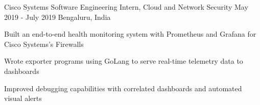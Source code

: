 \resumeExp
{Cisco Systems}
{Software Engineering Intern, Cloud and Network Security}
{May 2019 - July 2019}
{Bengaluru, India}

\resumeItemListStart
\item[$\bullet$]{Built an end-to-end health monitoring system with Prometheus and Grafana for Cisco Systems's Firewalls}
	\item[$\bullet$]{Wrote exporter programs using GoLang to serve real-time telemetry data to dashboards}
	\item[$\bullet$]{Improved debugging capabilities with correlated dashboards and automated visual alerts}
\resumeItemListEnd

\resumeSubHeadingListEnd
\vspace{-5.5mm}